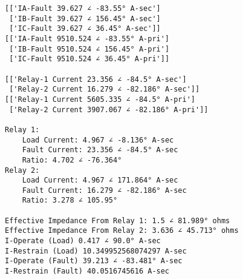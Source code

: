 \documentclass[11pt]{article}
\begin{document}
    \begin{Verbatim}[commandchars=\\\{\}]
[['IA-Fault 39.627 ∠ -83.55° A-sec']
 ['IB-Fault 39.627 ∠ 156.45° A-sec']
 ['IC-Fault 39.627 ∠ 36.45° A-sec']]
[['IA-Fault 9510.524 ∠ -83.55° A-pri']
 ['IB-Fault 9510.524 ∠ 156.45° A-pri']
 ['IC-Fault 9510.524 ∠ 36.45° A-pri']]

[['Relay-1 Current 23.356 ∠ -84.5° A-sec']
 ['Relay-2 Current 16.279 ∠ -82.186° A-sec']]
[['Relay-1 Current 5605.335 ∠ -84.5° A-pri']
 ['Relay-2 Current 3907.067 ∠ -82.186° A-pri']]

Relay 1:
	Load Current: 4.967 ∠ -8.136° A-sec
	Fault Current: 23.356 ∠ -84.5° A-sec
	Ratio: 4.702 ∠ -76.364° 
Relay 2:
	Load Current: 4.967 ∠ 171.864° A-sec
	Fault Current: 16.279 ∠ -82.186° A-sec
	Ratio: 3.278 ∠ 105.95° 

Effective Impedance From Relay 1: 1.5 ∠ 81.989° ohms
Effective Impedance From Relay 2: 3.636 ∠ 45.713° ohms
I-Operate (Load) 0.417 ∠ 90.0° A-sec
I-Restrain (Load) 10.349952568074297 A-sec
I-Operate (Fault) 39.213 ∠ -83.481° A-sec
I-Restrain (Fault) 40.0516745616 A-sec

    \end{Verbatim}


    
    
    
    
\end{document}
